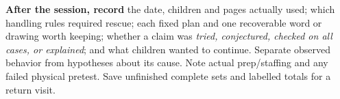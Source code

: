 \documentclass[11pt,letterpaper]{article}
\begin{document}
\textbf{After the session, record} the date, children and pages actually used;
which handling rules required rescue; each fixed plan and one recoverable word
or drawing worth keeping; whether a claim was \emph{tried, conjectured, checked
on all cases, or explained}; and what children wanted to continue. Separate
observed behavior from hypotheses about its cause. Note actual prep/staffing
and any failed physical pretest. Save unfinished complete sets and labelled
totals for a return visit.
\end{document}
